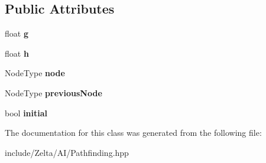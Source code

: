 \subsection*{Public Attributes}
\begin{DoxyCompactItemize}
\item 
\mbox{\label{classzt_1_1_discovered_node_abd40a3c5ffa8c7d7eb8acad9947ecfac}} 
float {\bfseries g}
\item 
\mbox{\label{classzt_1_1_discovered_node_aa7ba76666a021a6241aa50ed14eaf876}} 
float {\bfseries h}
\item 
\mbox{\label{classzt_1_1_discovered_node_a628117da1b7aaa57c668e84ad854cab2}} 
Node\+Type {\bfseries node}
\item 
\mbox{\label{classzt_1_1_discovered_node_a360b2f052598bde2eaf7f24a8f9130ce}} 
Node\+Type {\bfseries previous\+Node}
\item 
\mbox{\label{classzt_1_1_discovered_node_a0c59165132e985ad8cedc2b370cddfe4}} 
bool {\bfseries initial}
\end{DoxyCompactItemize}


The documentation for this class was generated from the following file\+:\begin{DoxyCompactItemize}
\item 
include/\+Zelta/\+A\+I/Pathfinding.\+hpp\end{DoxyCompactItemize}

